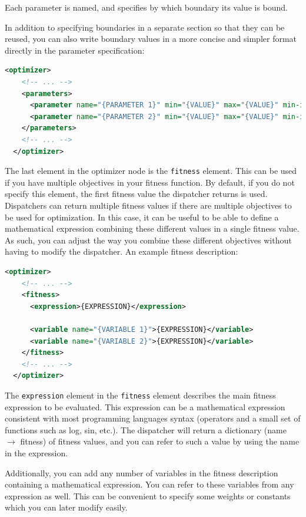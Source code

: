 \documentclass{report}
\begin{document}
Each parameter is named, and specifies by which boundary its value is bound.

In addition to specifying boundaries in a separate section so that they can
be reused, you can also write boundary values in a more concise and simpler
format directly in the parameter specification:

\begin{lstlisting}[language=xml]
  <optimizer>
    <!-- ... -->
    <parameters>
      <parameter name="{PARAMETER 1}" min="{VALUE}" max="{VALUE}" min-initial="{VALUE}" max-initial="{VALUE}"/>
      <parameter name="{PARAMETER 2}" min="{VALUE}" max="{VALUE}" min-initial="{VALUE}" max-initial="{VALUE}"/>
    </parameters>
    <!-- ... -->
  </optimizer>
\end{lstlisting}

The last element in the optimizer node is the \verb!fitness! element.
This can be used if you have
multiple objectives in your fitness function. By default, if you do not specify
this element, the first fitness value the dispatcher returns is used.
Dispatchers can return multiple fitness values if there are multiple objectives
to be used for optimization. In this case, it can be useful to be able to
define a mathematical expression combining these different values in a single
fitness value. As such, you can adjust the way you combine these different
objectives without having to modify the dispatcher. An example fitness
description:

\begin{lstlisting}[language=xml]
  <optimizer>
    <!-- ... -->
    <fitness>
      <expression>{EXPRESSION}</expression>

      <variable name="{VARIABLE 1}">{EXPRESSION}</variable>
      <variable name="{VARIABLE 2}">{EXPRESSION}</variable>
    </fitness>
    <!-- ... -->
  </optimizer>
\end{lstlisting}

The \verb!expression! element in the \verb!fitness! element describes the main
fitness expression to be evaluated. This expression can be a mathematical
expression consistent with most programming languages syntax (operators and
a small set of functions such as log, sin, etc.). The dispatcher will return
a dictionary (name $\rightarrow$ fitness) of fitness values, and you can refer
to such a value by using the name in the expression.

Additionally, you can add any number of variables in the fitness description
containing a mathematical expression. You can refer to these variables from
any expression as well. This can be convenient to specify some weights or
constants which you can later modify easily.
\end{document}
